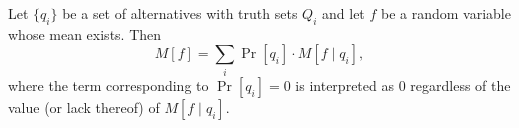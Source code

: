 Let $\{q_i\}$ be a set of alternatives with truth sets $Q_i$ and let $f$ be a random variable whose mean exists. Then
$$M[f] = \sum_i \Pr[q_i] \cdot M[f \mid q_i],$$
where the term corresponding to $\Pr[q_i] = 0$ is interpreted as $0$ regardless of the value (or lack thereof) of $M[f \mid q_i]$.
